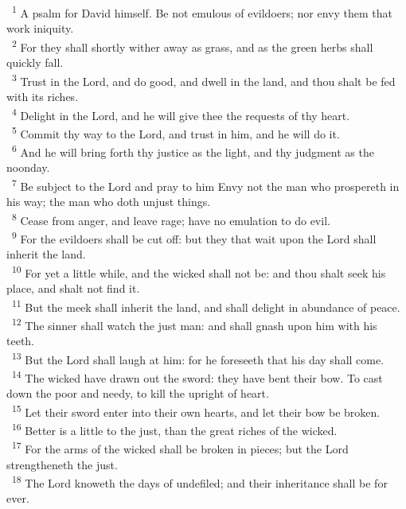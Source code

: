 \documentclass[a5paper,12pt]{article}
\begin{document}
\begin{multicols*}{2}
~\textsuperscript{1} A psalm for David himself. Be not emulous of evildoers; nor envy them that work iniquity.\\
~\textsuperscript{2} For they shall shortly wither away as grass, and as the green herbs shall quickly fall.\\
~\textsuperscript{3} Trust in the Lord, and do good, and dwell in the land, and thou shalt be fed with its riches.\\
~\textsuperscript{4} Delight in the Lord, and he will give thee the requests of thy heart.\\
~\textsuperscript{5} Commit thy way to the Lord, and trust in him, and he will do it.\\
~\textsuperscript{6} And he will bring forth thy justice as the light, and thy judgment as the noonday.\\
~\textsuperscript{7} Be subject to the Lord and pray to him Envy not the man who prospereth in his way; the man who doth unjust things.\\
~\textsuperscript{8} Cease from anger, and leave rage; have no emulation to do evil.\\
~\textsuperscript{9} For the evildoers shall be cut off: but they that wait upon the Lord shall inherit the land.\\
~\textsuperscript{10} For yet a little while, and the wicked shall not be: and thou shalt seek his place, and shalt not find it.\\
~\textsuperscript{11} But the meek shall inherit the land, and shall delight in abundance of peace.\\
~\textsuperscript{12} The sinner shall watch the just man: and shall gnash upon him with his teeth.\\
~\textsuperscript{13} But the Lord shall laugh at him: for he foreseeth that his day shall come.\\
~\textsuperscript{14} The wicked have drawn out the sword: they have bent their bow. To cast down the poor and needy, to kill the upright of heart.\\
~\textsuperscript{15} Let their sword enter into their own hearts, and let their bow be broken.\\
~\textsuperscript{16} Better is a little to the just, than the great riches of the wicked.\\
~\textsuperscript{17} For the arms of the wicked shall be broken in pieces; but the Lord strengtheneth the just.\\
~\textsuperscript{18} The Lord knoweth the days of undefiled; and their inheritance shall be for ever.\\

\end{multicols*}
\end{document}
